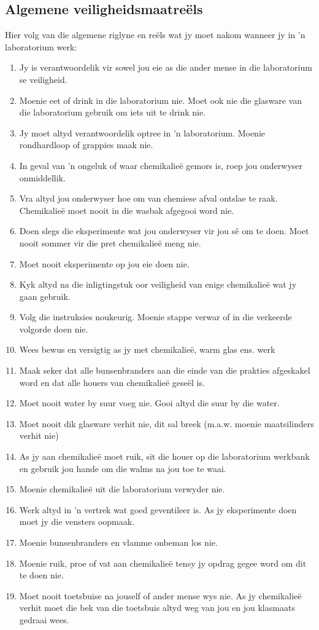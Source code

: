 \subsection*{Algemene veiligheidsmaatreëls}
            \nopagebreak
Hier volg van die algemene riglyne en reëls wat jy moet nakom wanneer jy in  'n laboratorium werk:
\begin{enumerate}[noitemsep, label=\textbf{\arabic*}. ] 
\item Jy is verantwoordelik vir sowel jou eie as die ander mense in die laboratorium se veiligheid.
\item Moenie eet of drink in die laboratorium nie. Moet ook nie die glasware van die laboratorium gebruik om iets uit te drink nie.
\item Jy moet altyd verantwoordelik optree in  'n laboratorium. Moenie rondhardloop of grappies maak nie.
\item In geval van  'n ongeluk of waar chemikalieë gemors is, roep jou onderwyser onmiddellik.
\item Vra altyd jou onderwyser hoe om van chemiese afval ontslae te raak. Chemikalieë moet nooit in die wasbak afgegooi word nie.
\item Doen slegs die eksperimente wat jou onderwyser vir jou sê om te doen. Moet nooit sommer vir die pret chemikalieë meng nie.
\item Moet nooit eksperimente op jou eie doen nie. 
\item Kyk altyd na die inligtingstuk oor veiligheid van enige chemikalieë wat jy gaan gebruik. 
\item Volg die instruksies noukeurig. Moenie stappe verwar of in die verkeerde volgorde doen nie. 
\item Wees bewus en versigtig as jy met chemikalieë, warm glas ens. werk  
\item Maak seker dat alle bunsenbranders aan die einde van die prakties afgeskakel word en dat alle houers van chemikalieë geseël is.
\item Moet nooit water by suur voeg nie. Gooi altyd die suur by die water.
\item Moet nooit dik glasware verhit nie, dit sal breek (m.a.w. moenie maatsilinders verhit nie)
\item As jy aan chemikalieë moet ruik, sit die houer op die laboratorium werkbank en gebruik jou hande om die walms na jou toe te waai.
\item Moenie chemikalieë uit die laboratorium verwyder nie.
\item Werk altyd in  'n vertrek wat goed geventileer is. As jy eksperimente doen moet jy die vensters oopmaak.
\item Moenie bunsenbranders en vlamme onbeman los nie.
\item Moenie ruik, proe of vat aan chemikalieë tensy jy opdrag gegee word om dit te doen nie.
\item Moet nooit toetsbuise na jouself of ander mense wys nie. As jy chemikalieë verhit moet die bek van die toetsbuis altyd weg van jou en jou klasmaats gedraai wees.
\end{enumerate}
\par 
